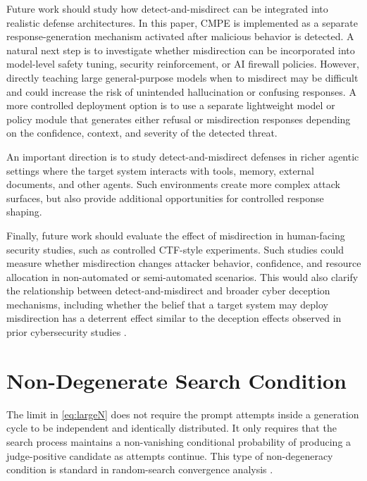 \documentclass[conference,compsoc]{IEEEtran}
\begin{document}
Future work should study how detect-and-misdirect can be integrated into
realistic defense architectures.
In this paper, CMPE is implemented as a separate response-generation mechanism activated after malicious behavior is
detected.
A natural next step is to investigate whether misdirection can be incorporated into model-level safety tuning, security reinforcement, or AI
firewall policies.
However, directly teaching large general-purpose models when
to misdirect may be difficult and could increase the risk of unintended
hallucination or confusing responses.
A more controlled deployment option is to
use a separate lightweight model or policy module that generates either refusal
or misdirection responses depending on the confidence, context, and severity of
the detected threat.

An important direction is to study detect-and-misdirect defenses in richer agentic
settings where the target system interacts with tools, memory, external
documents, and other agents.
Such environments create more complex attack
surfaces, but also provide additional opportunities for controlled response
shaping.

Finally, future work should evaluate the effect of misdirection in human-facing
security studies, such as controlled CTF-style experiments.
Such studies could
measure whether misdirection changes attacker behavior, confidence, and
resource allocation in non-automated or semi-automated scenarios.
This would
also clarify the relationship between detect-and-misdirect and broader cyber
deception mechanisms, including whether the belief that a target system may
deploy misdirection has a deterrent effect similar to the deception effects
observed in prior cybersecurity studies \cite{cydec-naval}.



\appendices
\section{Non-Degenerate Search Condition}
\label{app:nondegenerate-search}

The limit in \eqref{eq:largeN} does not require the prompt attempts inside a
generation cycle to be independent and identically distributed. It only
requires that the search process maintains a non-vanishing conditional
probability of producing a judge-positive candidate as attempts continue. This
type of non-degeneracy condition is standard in random-search convergence
analysis \cite{solis1981minimization}.
\end{document}

